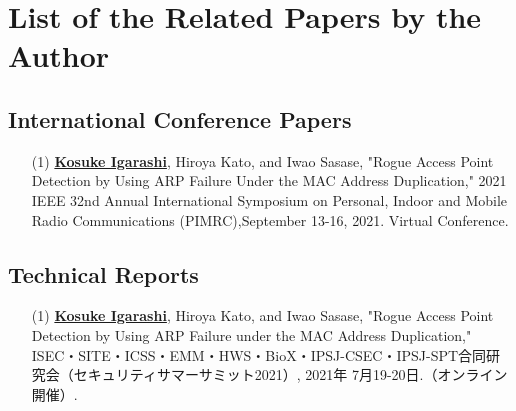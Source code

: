 \newpage
\appendix
\chapter{List of the Related Papers by the Author}

\section{International Conference Papers}
\begin{itemize}
  \item[(1)]
    {\bf \underline{Kosuke Igarashi}}, Hiroya Kato, and Iwao Sasase,
    "Rogue Access Point Detection by Using ARP Failure Under the MAC Address Duplication,"
    2021 IEEE 32nd Annual International Symposium on Personal, Indoor and Mobile Radio Communications (PIMRC),September 13-16, 2021. Virtual Conference.
\end{itemize}

\newpage

\section{Technical Reports}
\begin{itemize}
  \item[(1)]
    {\bf \underline{Kosuke Igarashi}}, Hiroya Kato, and Iwao Sasase,
    "Rogue Access Point Detection by Using ARP Failure under the MAC Address Duplication,"
    ISEC・SITE・ICSS・EMM・HWS・BioX・IPSJ-CSEC・IPSJ-SPT合同研究会（セキュリティサマーサミット2021）, 2021年 7月19-20日.（オンライン開催）.
\end{itemize}

